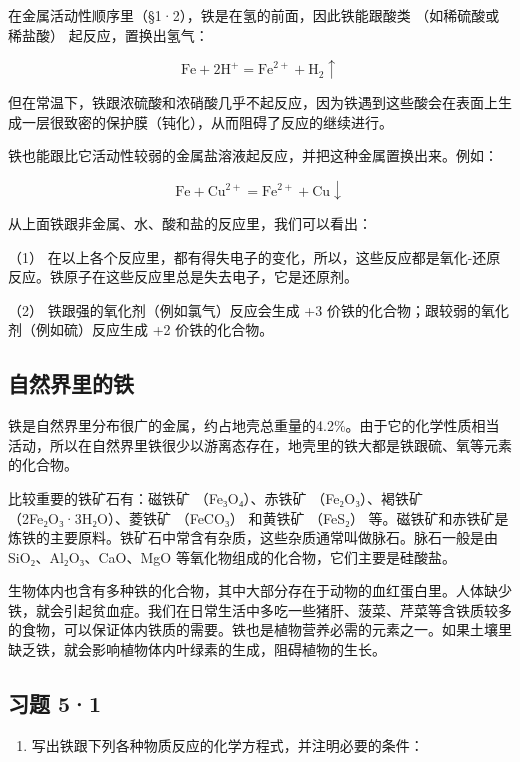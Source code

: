 在金属活动性顺序里（§1·2），铁是在氢的前面，因此铁能跟酸类
（如稀硫酸或稀盐酸） 起反应，置换出氢气：

\[
\mathrm{Fe} + 2 \mathrm{H} ^ {+} = \mathrm{Fe} ^{2+} + \mathrm{H} _ {2} \uparrow
\]

但在常温下，铁跟浓硫酸和浓硝酸几乎不起反应，因为铁遇到这些酸会在表面上生成一层很致密的保护膜（钝化），从而阻碍了反应的继续进行。

铁也能跟比它活动性较弱的金属盐溶液起反应，并把这种金属置换出来。例如：

\[
\mathrm{Fe} + \mathrm{Cu} ^{2+} = \mathrm{Fe} ^{2+} + \mathrm{Cu} \downarrow
\]

从上面铁跟非金属、水、酸和盐的反应里，我们可以看出：

（1）
在以上各个反应里，都有得失电子的变化，所以，这些反应都是氧化-还原反应。铁原子在这些反应里总是失去电子，它是还原剂。

（2） 铁跟强的氧化剂（例如氯气）反应会生成 +3
价铁的化合物；跟较弱的氧化剂（例如硫）反应生成 +2 价铁的化合物。

\subsection{自然界里的铁}

铁是自然界里分布很广的金属，约占地壳总重量的4.2\%。由于它的化学性质相当活动，所以在自然界里铁很少以游离态存在，地壳里的铁大都是铁跟硫、氧等元素的化合物。

比较重要的铁矿石有：磁铁矿 （Fe₃O₄）、赤铁矿 （Fe₂O₃）、褐铁矿
（2Fe₂O₃·3H₂O）、菱铁矿 （FeCO₃） 和黄铁矿 （FeS₂）
等。磁铁矿和赤铁矿是炼铁的主要原料。铁矿石中常含有杂质，这些杂质通常叫做脉石。脉石一般是由
SiO₂、Al₂O₃、CaO、MgO 等氧化物组成的化合物，它们主要是硅酸盐。

生物体内也含有多种铁的化合物，其中大部分存在于动物的血红蛋白里。人体缺少铁，就会引起贫血症。我们在日常生活中多吃一些猪肝、菠菜、芹菜等含铁质较多的食物，可以保证体内铁质的需要。铁也是植物营养必需的元素之一。如果土壤里缺乏铁，就会影响植物体内叶绿素的生成，阻碍植物的生长。

\subsection{习题 5·1}

\begin{enumerate}
\item
  写出铁跟下列各种物质反应的化学方程式，并注明必要的条件：
\end{enumerate}

